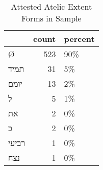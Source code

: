 \begin{table}[htbp!]
\centering
\caption{Attested Atelic Extent Forms in Sample}
\label{table:atel_front}
\begin{tabular}{lrl}
\toprule
{} &  count & percent \\
\midrule
\texthebrew{Ø}     &    523 &     90\% \\
\texthebrew{תמיד}  &     31 &      5\% \\
\texthebrew{יומם}  &     13 &      2\% \\
\texthebrew{ל}     &      5 &      1\% \\
\texthebrew{את}    &      2 &      0\% \\
\texthebrew{כ}     &      2 &      0\% \\
\texthebrew{רביעי} &      1 &      0\% \\
\texthebrew{נצח}   &      1 &      0\% \\
\bottomrule
\end{tabular}
\end{table}

